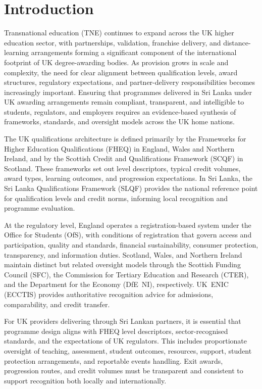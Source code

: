 \section{Introduction}

Transnational education (TNE) continues to expand across the UK higher education sector, with partnerships, validation, franchise delivery, and distance-learning arrangements forming a significant component of the international footprint of UK degree-awarding bodies. As provision grows in scale and complexity, the need for clear alignment between qualification levels, award structures, regulatory expectations, and partner-delivery responsibilities becomes increasingly important. Ensuring that programmes delivered in Sri Lanka under UK awarding arrangements remain compliant, transparent, and intelligible to students, regulators, and employers requires an evidence-based synthesis of frameworks, standards, and oversight models across the UK home nations.

The UK qualifications architecture is defined primarily by the Frameworks for Higher Education Qualifications (FHEQ) in England, Wales and Northern Ireland, and by the Scottish Credit and Qualifications Framework (SCQF) in Scotland. These frameworks set out level descriptors, typical credit volumes, award types, learning outcomes, and progression expectations. In Sri Lanka, the Sri Lanka Qualifications Framework (SLQF) provides the national reference point for qualification levels and credit norms, informing local recognition and programme evaluation.

At the regulatory level, England operates a registration-based system under the Office for Students (OfS), with conditions of registration that govern access and participation, quality and standards, financial sustainability, consumer protection, transparency, and information duties. Scotland, Wales, and Northern Ireland maintain distinct but related oversight models through the Scottish Funding Council (SFC), the Commission for Tertiary Education and Research (CTER), and the Department for the Economy (DfE~NI), respectively. UK~ENIC (ECCTIS) provides authoritative recognition advice for admissions, comparability, and credit transfer.

For UK providers delivering through Sri Lankan partners, it is essential that programme design aligns with FHEQ level descriptors, sector-recognised standards, and the expectations of UK regulators. This includes proportionate oversight of teaching, assessment, student outcomes, resources, support, student protection arrangements, and reportable events handling. Exit awards, progression routes, and credit volumes must be transparent and consistent to support recognition both locally and internationally.

